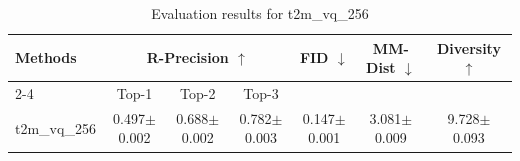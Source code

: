 \begin{table}[h]
\centering
\begin{tabular}{l ccc ccc}
\toprule
\multirow{2}{*}{\textbf{Methods}} & \multicolumn{3}{c}{\textbf{R-Precision $\uparrow$}} & \multirow{2}{*}{\textbf{FID $\downarrow$}} & \multirow{2}{*}{\textbf{MM-Dist $\downarrow$}} & \multirow{2}{*}{\textbf{Diversity $\uparrow$}} \\
\cmidrule(lr){2-4}
& Top-1 & Top-2 & Top-3 & & & \\
\midrule
t2m_vq_256 & 0.497$\pm$0.002 & 0.688$\pm$0.002 & 0.782$\pm$0.003 & 0.147$\pm$0.001 & 3.081$\pm$0.009 & 9.728$\pm$0.093 \\
\bottomrule
\end{tabular}
\caption{Evaluation results for t2m_vq_256}
\label{tab:results_t2m_vq_256}
\end{table}
